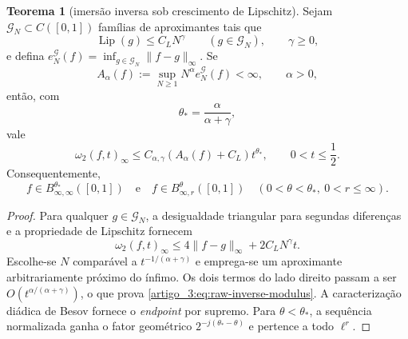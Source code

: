 \documentclass[12pt,a4paper]{article}
\theoremstyle{preciso}
\theoremstyle{definition}
\theoremstyle{preciso}
\newtheorem{theorem}[teorema]{Teorema}
\theoremstyle{preciso}
\theoremstyle{preciso}
\theoremstyle{preciso}
\theoremstyle{definition}
\theoremstyle{preciso}
\theoremstyle{definition}
\theoremstyle{preciso}
\theoremstyle{preciso}
\theoremstyle{definition}
\begin{document}
\begin{theorem}[imersão inversa sob crescimento de Lipschitz]\label{map:artigo_3:5.7}
\label{artigo_3:thm:raw-lossy-inverse}
Sejam $\mathcal G_N\subset C([0,1])$ famílias de aproximantes tais que
\begin{equation}
 \operatorname{Lip}(g)\le C_LN^\gamma
 \qquad(g\in\mathcal G_N),
 \qquad \gamma\ge0,
 \label{artigo_3:eq:lipschitz-growth-family}
\end{equation}
e defina
$e_N^{\mathcal G}(f)=\inf_{g\in\mathcal G_N}\|f-g\|_\infty$. Se
\begin{equation}
 A_\alpha(f):=\sup_{N\ge1}N^\alpha e_N^{\mathcal G}(f)<\infty,
 \qquad \alpha>0,
 \label{artigo_3:eq:raw-rate-assumption}
\end{equation}
então, com
\begin{equation}
 \theta_* = \frac{\alpha}{\alpha+\gamma},
 \label{artigo_3:eq:critical-reverse-exponent}
\end{equation}
vale
\begin{equation}
 \omega_2(f,t)_\infty
 \le C_{\alpha,\gamma}(A_\alpha(f)+C_L)t^{\theta_*},
 \qquad 0<t\le\frac12.
 \label{artigo_3:eq:raw-inverse-modulus}
\end{equation}
Consequentemente,
\begin{equation}
 f\in B^{\theta_*}_{\infty,\infty}([0,1])
 \quad\text{e}\quad
 f\in B^\theta_{\infty,r}([0,1])
 \quad(0<\theta<\theta_*,\ 0<r\le\infty).
 \label{artigo_3:eq:raw-inverse-besov}
\end{equation}
\end{theorem}

\begin{proof}
Para qualquer $g\in\mathcal G_N$, a desigualdade triangular para segundas
diferenças e a propriedade de Lipschitz fornecem
\begin{equation}
 \omega_2(f,t)_\infty
 \le4\|f-g\|_\infty+2C_LN^\gamma t.
 \label{artigo_3:eq:inverse-balance}
\end{equation}
Escolhe-se $N$ comparável a $t^{-1/(\alpha+\gamma)}$ e emprega-se um aproximante
arbitrariamente próximo do ínfimo. Os dois termos do lado direito passam a
ser $O(t^{\alpha/(\alpha+\gamma)})$, o que prova
\eqref{artigo_3:eq:raw-inverse-modulus}. A caracterização diádica de Besov fornece o
\emph{endpoint} por supremo. Para $\theta<\theta_*$, a sequência normalizada ganha o
fator geométrico $2^{-j(\theta_*-\theta)}$ e pertence a todo $\ell^r$.
\end{proof}
\end{document}
